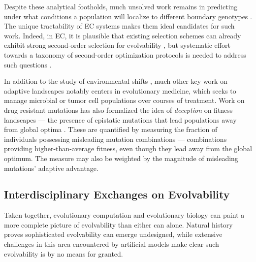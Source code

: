Despite these analytical footholds, much unsolved work remains in predicting under what conditions a population will localize to different boundary genotypes \citep{kussell2006polymerpopulation}.
The unique tractability of EC systems makes them ideal candidates for such work.
Indeed, in EC, it is plausible that existing selection schemes can already exhibit strong second-order selection for evolvability \citep{hu2010evolvability,doncieux2020novelty,lehman2015enhancing}, but systematic effort towards a taxonomy of second-order optimization protocols is needed to address such questions \citep{gajewski2019evolvability,mengistu2016evolvability,hu2010evolvability}.

In addition to the study of environmental shifts \citep{king2025fitness,gatenby2020integrating,acar2020exploiting,goulart2013designing}, much other key work on adaptive landscapes notably centers in evolutionary medicine, which seeks to manage microbial or tumor cell populations over courses of treatment.
Work on drug resistant mutations has also formalized the idea of \textit{deception} on fitness landscapes --- the presence of epistatic mutations that lead populations away from global optima \citep{eppstein2016quantifying,ogbunugafor2016competition}.
These are quantified by measuring the fraction of individuals possessing misleading mutation combinations --- combinations providing higher-than-average fitness, even though they lead away from the global optimum.
The measure may also be weighted by the magnitude of misleading mutations' adaptive advantage.

\subsection{Interdisciplinary Exchanges on Evolvability}

Taken together, evolutionary computation and evolutionary biology can paint a more complete picture of evolvability than either can alone.
Natural history proves sophisticated evolvability can emerge undesigned, while extensive challenges in this area encountered by artificial models make clear such evolvability is by no means for granted.

